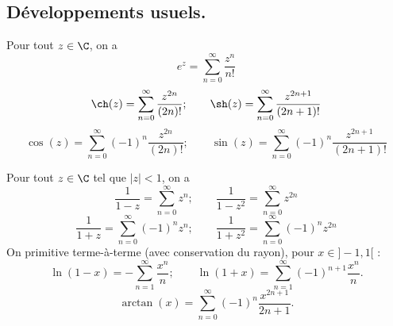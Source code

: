 \documentclass[11pt]{article}
\begin{document}
\subsection{Développements usuels.}

\begin{prop}{}{}
    Pour tout $z\in\C$, on a
    \begin{equation*}
        e^z = \sum_{n=0}^\infty\frac{z^n}{n!}
    \end{equation*}
    \begin{equation*}
        \ch(z) = \sum_{n=0}^\infty\frac{z^{2n}}{(2n)!}; \qquad \sh(z) = \sum_{n=0}^\infty\frac{z^{2n+1}}{(2n+1)!}
    \end{equation*}
    \begin{equation*}
        \cos(z) = \sum_{n=0}^\infty (-1)^n\frac{z^{2n}}{(2n)!}; \qquad \sin(z)=\sum_{n=0}^\infty(-1)^n\frac{z^{2n+1}}{(2n+1)!}
    \end{equation*}
\end{prop}

\vspace*{-0.8cm}

\begin{prop}{}{}
    Pour tout $z\in\C$ tel que $|z|<1$, on a
    \begin{equation*}
        \frac{1}{1-z} = \sum_{n=0}^\infty z^n; \qquad \frac{1}{1-z^2} = \sum_{n=0}^\infty z^{2n}
    \end{equation*}
    \begin{equation*}
        \frac{1}{1+z}= \sum_{n=0}^\infty(-1)^nz^n; \qquad \frac{1}{1+z^2} = \sum_{n=0}^\infty (-1)^nz^{2n}
    \end{equation*}
    On primitive terme-à-terme (avec conservation du rayon), pour $x\in]-1,1[$ :
    \begin{equation*}
        \ln(1-x) = -\sum_{n=1}^\infty \frac{x^{n}}{n}; \qquad \ln(1+x) = \sum_{n=1}^\infty (-1)^{n+1}\frac{x^n}{n}.
    \end{equation*}
    \begin{equation*}
        \arctan(x)=\sum_{n=0}^\infty(-1)^n\frac{x^{2n+1}}{2n+1}.
    \end{equation*}
\end{prop}

\vspace*{-0.8cm}
\end{document}
